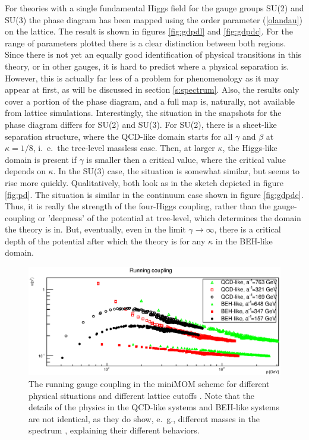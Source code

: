 \documentclass[final,12pt,3p,longtitle]{elsarticle}
\newcommand*{\pref}[1]{(\ref{#1})}
\newcommand*{\1}{1\!\!\!\bot}
\begin{document}
For theories with a single fundamental Higgs field for the gauge groups SU(2) \cite{Maas:2014pba} and SU(3) \cite{Maas:2016ngo} the phase diagram has been mapped using the order parameter \pref{olandau} on the lattice. The result is shown in figures \ref{fig:gdpdl} and \ref{fig:gdpdc}. For the range of parameters plotted there is a clear distinction between both regions. Since there is not yet an equally good identification of physical transitions in this theory, or in other gauges, it is hard to predict where a physical separation is. However, this is actually far less of a problem for phenomenology as it may appear at first, as will be discussed in section \ref{s:spectrum}. Also, the results only cover a portion of the phase diagram, and a full map is, naturally, not available from lattice simulations. Interestingly, the situation in the snapshots for the phase diagram differs for SU(2) and SU(3). For SU(2), there is a sheet-like separation structure, where the QCD-like domain starts for all $\gamma$ and $\beta$ at $\kappa=1/8$, i.\ e.\ the tree-level massless case. Then, at larger $\kappa$, the Higgs-like domain is present if $\gamma$ is smaller then a critical value, where the critical value depends on $\kappa$. In the SU(3) case, the situation is somewhat similar, but seems to rise more quickly. Qualitatively, both look as in the sketch depicted in figure \ref{fig:pd}. The situation is similar in the continuum case shown in figure \ref{fig:gdpdc}. Thus, it is really the strength of the four-Higgs coupling, rather than the gauge-coupling or 'deepness' of the potential at tree-level, which determines the domain the theory is in. But, eventually, even in the limit $\gamma\to\infty$, there is a critical depth of the potential after which the theory is for any $\kappa$ in the BEH-like domain.

\begin{figure}[!htbp]
\includegraphics[width=\linewidth]{alpha}
\caption{\label{fig:alpha}The running gauge coupling in the miniMOM scheme \cite{vonSmekal:2009ae} for different physical situations and different lattice cutoffs \cite{Maas:2013aia,Maas:unpublished}. Note that the details of the physics in the QCD-like systems and BEH-like systems are not identical, as they do show, e.\ g., different masses in the spectrum \cite{Maas:2013aia}, explaining their different behaviors.}
\end{figure}
\end{document}
